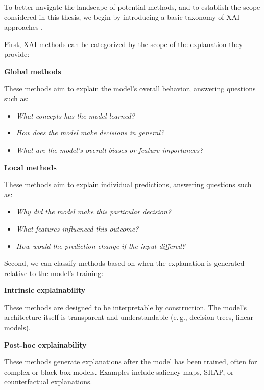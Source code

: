 To better navigate the landscape of potential methods, and to establish the scope considered in this thesis, we begin by introducing a basic taxonomy of XAI approaches \cite{guidotti2018survey}.

First, XAI methods can be categorized by the scope of the explanation they provide:

\begin{multicols}{2}
    \centering \textbf{Global methods} \\[4pt]
    \raggedright
    These methods aim to explain the model's overall behavior, answering questions such as:
    \vspace{0.25cm}
    \begin{itemize}
        \item \textit{What concepts has the model learned?}
        \item \textit{How does the model make decisions in general?}
        \item \textit{What are the model's overall biases or feature importances?}
    \end{itemize}

    \columnbreak

    \centering \textbf{Local methods} \\[4pt]
    \raggedright
    These methods aim to explain individual predictions, answering questions such as:
    \vspace{0.25cm}
    \begin{itemize}
        \item \textit{Why did the model make this particular decision?}
        \item \textit{What features influenced this outcome?}
        \item \textit{How would the prediction change if the input differed?}
    \end{itemize}
\end{multicols}

Second, we can classify methods based on when the explanation is generated relative to the model's training:

\begin{multicols}{2}
    \centering \textbf{Intrinsic explainability} \\[4pt]
    \raggedright
    These methods are designed to be interpretable by construction.
    The model's architecture itself is transparent and understandable (e.\,g., decision trees, linear models).

    \columnbreak

    \centering \textbf{Post-hoc explainability} \\[4pt]
    \raggedright
    These methods generate explanations after the model has been trained, often for complex or black-box models.
    Examples include saliency maps, SHAP, or counterfactual explanations.
\end{multicols}

